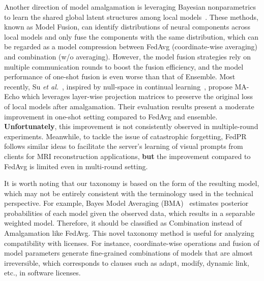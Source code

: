 Another direction of model amalgamation is leveraging Bayesian nonparametrics to learn the shared global latent structures among local models~\cite{yurochkin2019bayesian, yurochkin2019statistical, lam2021model}. 
These methods, known as Model Fusion, can identify distributions of neural components across local models and only fuse the components with the same distribution, which can be regarded as a model compression between FedAvg (coordinate-wise averaging) and combination (w/o averaging).
However, the model fusion strategies rely on multiple communication rounds to boost the fusion efficiency, and the model performance of one-shot fusion is even worse than that of Ensemble.
Most recently, Su \textit{et al.}~\cite{su2023one}, inspired by null-space in continual learning~\cite{wang2021training, kong2022balancing}, propose MA-Echo which leverages layer-wise projection matrices to preserve the original loss of local models after amalgamation.
Their evaluation results present a moderate improvement in one-shot setting compared to FedAvg and ensemble.
\textbf{Unfortunately}, this improvement is not consistently observed in multiple-round experiments.
Meanwhile, to tackle the issue of catastrophic forgetting, FedPR~\cite{feng2023learning} follows similar ideas to facilitate the server's learning of visual prompts from clients for MRI reconstruction applications, \textbf{but} the improvement compared to FedAvg is limited even in multi-round setting.

It is worth noting that our taxonomy is based on the form of the resulting model, which may not be entirely consistent with the terminology used in the technical perspective.
For example, Bayes Model Averaging (BMA)~\cite{clarke2003comparing} estimates posterior probabilities of each model given the observed data, which results in a separable weighted model. 
Therefore, it should be classified as Combination instead of Amalgamation like FedAvg.
This novel taxonomy method is useful for analyzing compatibility with licenses. 
For instance, coordinate-wise operations and fusion of model parameters generate fine-grained combinations of models that are almost irreversible, which corresponds to clauses such as adapt, modify, dynamic link, etc., in software licenses.

